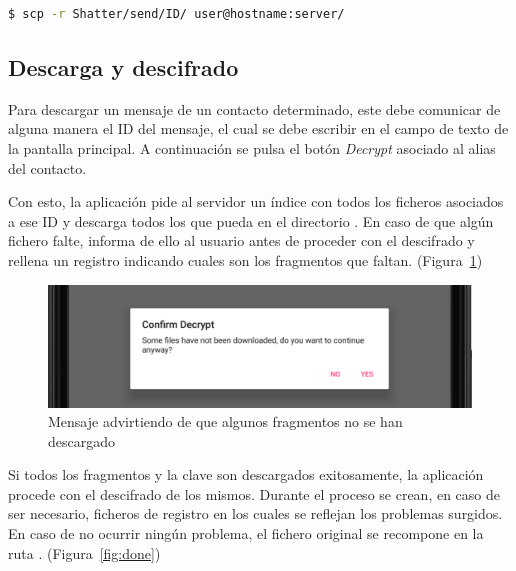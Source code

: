 \lstset{basicstyle=\ttfamily}
\begin{lstlisting}[language=bash]
  $ scp -r Shatter/send/ID/ user@hostname:server/
\end{lstlisting}

\subsection{Descarga y descifrado}

Para descargar un mensaje de un contacto determinado, este debe comunicar de alguna manera el ID del mensaje, el cual se debe escribir en el campo de texto de la pantalla principal. A continuación se pulsa el botón \emph{Decrypt} asociado al alias del contacto.

Con esto, la aplicación pide al servidor un índice con todos los ficheros asociados a ese ID y descarga todos los que pueda en el directorio . En caso de que algún fichero falte, informa de ello al usuario antes de proceder con el descifrado y rellena un registro indicando cuales son los fragmentos que faltan. (Figura~\ref{fig:miss})

\begin{figure}[!htb]
  \centering
  \includegraphics[scale=0.4]{Figures/miss}
  \decoRule
  \caption[Shatter (Faltan fragmentos)]{Mensaje advirtiendo de que algunos fragmentos no se han descargado}
  \label{fig:miss}
\end{figure}

Si todos los fragmentos y la clave son descargados exitosamente, la aplicación procede con el descifrado de los mismos. Durante el proceso se crean, en caso de ser necesario, ficheros de registro en los cuales se reflejan los problemas surgidos. En caso de no ocurrir ningún problema, el fichero original se recompone en la ruta . (Figura~\ref{fig:done})

